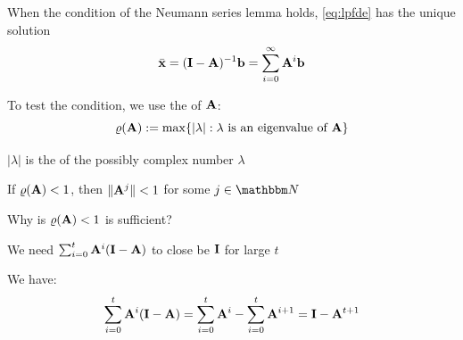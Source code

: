 \begin{frame}

    \vspace{.7em}
    When the condition of the Neumann series lemma holds, \eqref{eq:lpfde}
    has the unique solution
    \begin{equation*}
        \bar {{\mathbf x}} 
        = (\mathbf I - \mathbf A)^{-1} {\mathbf b} 
        = \sum_{i=0}^{\infty} \mathbf A^i  {\mathbf b} 
    \end{equation*}
    
    To test the condition, we use the   of
    $\mathbf A$:
    \begin{equation*}
        \label{eq:srmn}
        \varrho(\mathbf A) := \max \{  |\lambda|  :  \lambda \text{ is an eigenvalue of } \mathbf A \}
    \end{equation*}
    
    \vspace{1em}
    $|\lambda|$ is the  of the possibly complex number
    $\lambda$
    

\end{frame}

\begin{frame}

    \vspace{2em}
    \Fact
    If $\varrho(\mathbf A) < 1$, then $\| \mathbf A^j \| < 1$ for some $j \in \NN$
    
    \vspace{.7em}
    Why is $\varrho(\mathbf A) < 1$ is sufficient?
    
    We need
    $\sum_{i=0}^t \mathbf A^i (\mathbf I - \mathbf A)$ to close be $\mathbf I$ for
    large $t$
    
    We have:
    \begin{equation*}
        \sum_{i=0}^t \mathbf A^i (\mathbf I - \mathbf A)
        =
        \sum_{i=0}^t \mathbf A^i - \sum_{i=0}^t \mathbf A^{i+1}
        =
        \mathbf I - \mathbf A^{t+1}
    \end{equation*}

\end{frame}

